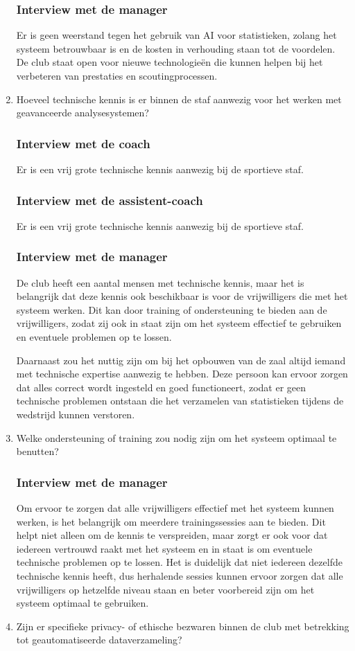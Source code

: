 \begin{enumerate}
  \subsubsection{Interview met de manager}
  Er is geen weerstand tegen het gebruik van AI voor statistieken, zolang het systeem betrouwbaar is en de kosten in verhouding staan tot de voordelen. De club staat open voor nieuwe technologieën die kunnen helpen bij het verbeteren van prestaties en scoutingprocessen.
  \item Hoeveel technische kennis is er binnen de staf aanwezig voor het werken met geavanceerde analysesystemen?
  \subsubsection{Interview met de coach}
  Er is een vrij grote technische kennis aanwezig bij de sportieve staf.
  \subsubsection{Interview met de assistent-coach}
  Er is een vrij grote technische kennis aanwezig bij de sportieve staf.
  \subsubsection{Interview met de manager}
  De club heeft een aantal mensen met technische kennis, maar het is belangrijk dat deze kennis ook beschikbaar is voor de vrijwilligers die met het systeem werken. Dit kan door training of ondersteuning te bieden aan de vrijwilligers, zodat zij ook in staat zijn om het systeem effectief te gebruiken en eventuele problemen op te lossen.

  Daarnaast zou het nuttig zijn om bij het opbouwen van de zaal altijd iemand met technische expertise aanwezig te hebben. Deze persoon kan ervoor zorgen dat alles correct wordt ingesteld en goed functioneert, zodat er geen technische problemen ontstaan die het verzamelen van statistieken tijdens de wedstrijd kunnen verstoren.
  \item Welke ondersteuning of training zou nodig zijn om het systeem optimaal te benutten?
  \subsubsection{Interview met de manager}
  Om ervoor te zorgen dat alle vrijwilligers effectief met het systeem kunnen werken, is het belangrijk om meerdere trainingssessies aan te bieden. Dit helpt niet alleen om de kennis te verspreiden, maar zorgt er ook voor dat iedereen vertrouwd raakt met het systeem en in staat is om eventuele technische problemen op te lossen. Het is duidelijk dat niet iedereen dezelfde technische kennis heeft, dus herhalende sessies kunnen ervoor zorgen dat alle vrijwilligers op hetzelfde niveau staan en beter voorbereid zijn om het systeem optimaal te gebruiken.
  \item Zijn er specifieke privacy- of ethische bezwaren binnen de club met betrekking tot geautomatiseerde dataverzameling?

\end{enumerate}
